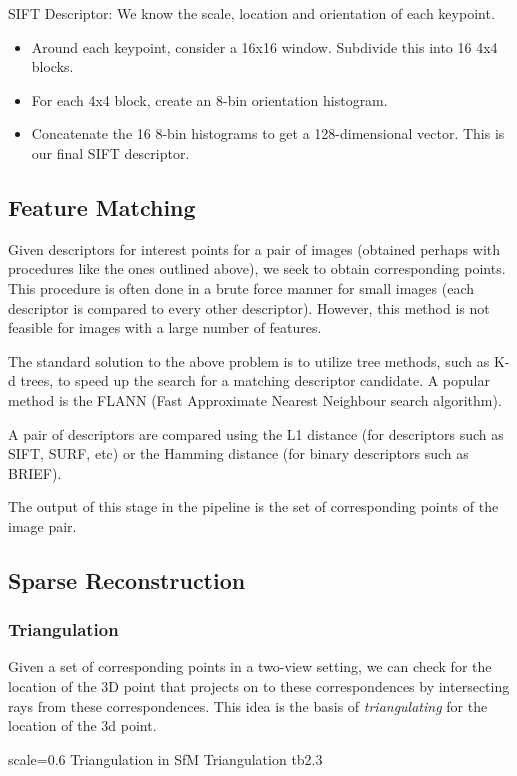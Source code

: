 SIFT Descriptor: We know the scale, location and orientation of each keypoint. 
\begin{itemize}
	\item Around each keypoint, consider a 16x16 window. Subdivide this into 16 4x4 blocks.
	\item For each 4x4 block, create an 8-bin orientation histogram. 
	\item Concatenate the 16 8-bin histograms to get a 128-dimensional vector. This is our final SIFT descriptor. 
\end{itemize}

\subsection{Feature Matching}
Given descriptors for interest points for a pair of images (obtained perhaps with procedures like the ones outlined above), we seek to obtain corresponding points. This procedure is often done in a brute force manner for small images (each descriptor is compared to every other descriptor). However, this method is not feasible for images with a large number of features.

The standard solution to the above problem is to utilize tree methods, such as K-d trees, to speed up the search for a matching descriptor candidate. A popular method is the FLANN (Fast Approximate Nearest Neighbour search algorithm).

A pair of descriptors are compared using the L1 distance (for descriptors such as SIFT, SURF, etc) or the Hamming distance (for binary descriptors such as BRIEF).

The output of this stage in the pipeline is the set of corresponding points of the image pair. 

\subsection{Sparse Reconstruction}
\subsubsection{Triangulation}
Given a set of corresponding points in a two-view setting, we can check for the location of the 3D point that projects on to these correspondences by intersecting rays from these correspondences. This idea is the basis of \emph{triangulating} for the location of the 3d point.

{scale=0.6}%
{Triangulation in SfM}%
{Triangulation}%
{tb2.3}

